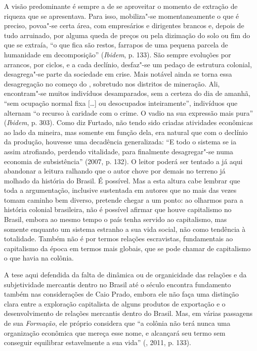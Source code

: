 A visão predominante é sempre a de se aproveitar o momento de extração
de riqueza que se apresentava. Para isso, mobiliza"-se momentaneamente
o que é preciso, povoa"-se certa área, com empresários e dirigentes
brancos e, depois de tudo arruinado, por alguma queda de preços ou pela
dizimação do solo ou fim do que se extraía, ``o que fica são restos,
farrapos de uma pequena parcela de humanidade em decomposição''
(\emph{Ibidem}, p. 133). São sempre evoluções por arrancos, por ciclos,
e a cada declínio, desfaz"-se um pedaço de estrutura colonial,
desagrega"-se parte da sociedade em crise. Mais notável ainda se torna
essa desagregação no começo do , sobretudo nos distritos de
mineração. Ali, encontram"-se muitos indivíduos desamparados, sem a
certeza do dia de amanhã, ``sem ocupação normal fixa [\ldots{}] ou
desocupados inteiramente'', indivíduos que alternam ``o recurso à
caridade com o crime. O vadio na sua expressão mais pura''
(\emph{Ibidem}, p. 303). Como diz Furtado, não tendo sido criadas
atividades econômicas ao lado da mineira, mas somente em função dela,
era natural que com o declínio da produção, houvesse uma decadência
generalizada: ``E todo o sistema se ia assim atrofiando, perdendo
vitalidade, para finalmente desagregar"-se numa economia de
subsistência'' (2007, p. 132). O leitor poderá ser tentado a já
aqui abandonar a leitura ralhando que o autor chove por demais no
terreno já molhado da história do Brasil. É possível. Mas a esta
altura cabe lembrar que toda a argumentação, inclusive sustentada
em autores que no mais das vezes tomam caminho bem diverso, pretende
chegar a um ponto: ao olharmos para a história colonial brasileira,
não é possível afirmar que houve capitalismo no Brasil, embora ao
mesmo tempo o país tenha servido ao capitalismo, mas somente enquanto
um sistema estranho a sua vida social, não como tendência à totalidade.
Também não é por termos relações escravistas, fundamentais ao
capitalismo da época em termos mais globais, que se pode chamar de
capitalismo o que havia na colônia.

A tese aqui defendida da falta de dinâmica ou de organicidade das
relações e da subjetividade mercantis dentro no Brasil até o século 
encontra fundamento também nas considerações de Caio Prado, embora ele
não faça uma distinção clara entre a exploração capitalista de alguns
produtos de exportação e o desenvolvimento de relações mercantis dentro
do Brasil. Mas, em várias passagens de sua \emph{Formação}, ele próprio
considera que ``a colônia não terá nunca uma organização econômica que
mereça esse nome, e alcançará seu termo sem conseguir equilibrar
estavelmente a sua vida'' (, 2011, p. 133).

